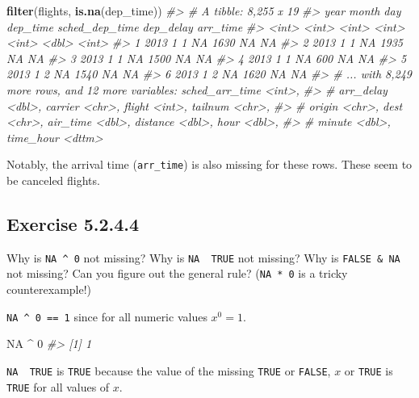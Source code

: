 \documentclass[]{book}
\newenvironment{Shaded}{\begin{snugshade}}{\end{snugshade}}
\newcommand{\CommentTok}[1]{\textcolor[rgb]{0.56,0.35,0.01}{\textit{#1}}}
\newcommand{\DecValTok}[1]{\textcolor[rgb]{0.00,0.00,0.81}{#1}}
\newcommand{\KeywordTok}[1]{\textcolor[rgb]{0.13,0.29,0.53}{\textbf{#1}}}
\newcommand{\NormalTok}[1]{#1}
\newcommand{\OperatorTok}[1]{\textcolor[rgb]{0.81,0.36,0.00}{\textbf{#1}}}
\newcommand{\OtherTok}[1]{\textcolor[rgb]{0.56,0.35,0.01}{#1}}
\newcommand{\StringTok}[1]{\textcolor[rgb]{0.31,0.60,0.02}{#1}}
\theoremstyle{plain}
\theoremstyle{remark}
\begin{document}
\begin{Shaded}
\begin{Highlighting}[]
\KeywordTok{filter}\NormalTok{(flights, }\KeywordTok{is.na}\NormalTok{(dep_time))}
\CommentTok{#> # A tibble: 8,255 x 19}
\CommentTok{#>    year month   day dep_time sched_dep_time dep_delay arr_time}
\CommentTok{#>   <int> <int> <int>    <int>          <int>     <dbl>    <int>}
\CommentTok{#> 1  2013     1     1       NA           1630        NA       NA}
\CommentTok{#> 2  2013     1     1       NA           1935        NA       NA}
\CommentTok{#> 3  2013     1     1       NA           1500        NA       NA}
\CommentTok{#> 4  2013     1     1       NA            600        NA       NA}
\CommentTok{#> 5  2013     1     2       NA           1540        NA       NA}
\CommentTok{#> 6  2013     1     2       NA           1620        NA       NA}
\CommentTok{#> # ... with 8,249 more rows, and 12 more variables: sched_arr_time <int>,}
\CommentTok{#> #   arr_delay <dbl>, carrier <chr>, flight <int>, tailnum <chr>,}
\CommentTok{#> #   origin <chr>, dest <chr>, air_time <dbl>, distance <dbl>, hour <dbl>,}
\CommentTok{#> #   minute <dbl>, time_hour <dttm>}
\end{Highlighting}
\end{Shaded}

Notably, the arrival time (\texttt{arr\_time}) is also missing for these rows. These
seem to be canceled flights.

\hypertarget{exercise-5.2.4.4}{%
\subsection*{\texorpdfstring{Exercise {5.2.4.4}}{Exercise 5.2.4.4}}\label{exercise-5.2.4.4}}

Why is \texttt{NA\ \^{}\ 0} not missing? Why is \texttt{NA\ \textbar{}\ TRUE} not missing?
Why is \texttt{FALSE\ \&\ NA} not missing? Can you figure out the general rule?
(\texttt{NA\ *\ 0} is a tricky counterexample!)

\texttt{NA\ \^{}\ 0\ ==\ 1} since for all numeric values \(x ^ 0 = 1\).

\begin{Shaded}
\begin{Highlighting}[]
\OtherTok{NA} \OperatorTok{^}\StringTok{ }\DecValTok{0}
\CommentTok{#> [1] 1}
\end{Highlighting}
\end{Shaded}

\texttt{NA\ \textbar{}\ TRUE} is \texttt{TRUE} because the value of the missing \texttt{TRUE} or \texttt{FALSE},
\(x\) or \texttt{TRUE} is \texttt{TRUE} for all values of \(x\).
\end{document}
